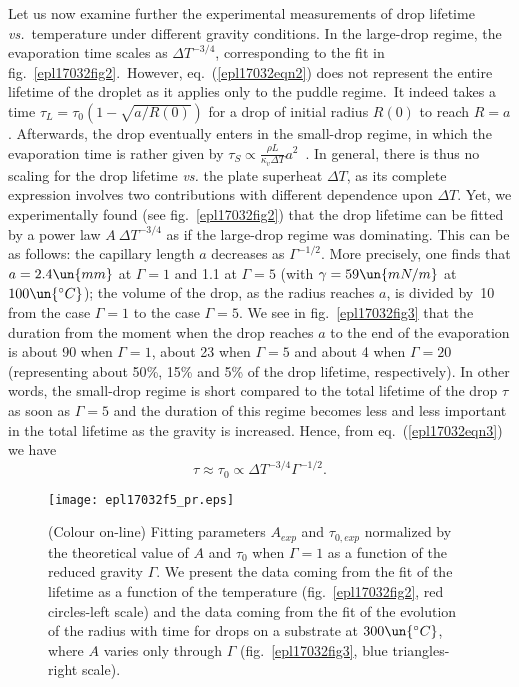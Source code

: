 \documentclass[doublecol,final]{epl2}
\begin{document}
Let us now examine further the experimental measurements of drop lifetime \textit{vs.}~temperature under different gravity conditions. In the large-drop regime, the evaporation time scales as $\Delta T^{-3/4}$, corresponding to the fit  in fig.~\ref{epl17032fig2}.~However, eq.~(\ref{epl17032eqn2}) does not represent the entire lifetime of the droplet as it applies only to the puddle regime.~It indeed takes a time ${\tau_L=\tau_0 (1-\sqrt{a/R(0)})}$ for a drop of initial radius $R(0)$ to reach $R=a$. Afterwards, the drop eventually enters in the small-drop regime, in which the evaporation time is rather given by $\tau_S \propto \frac{\rho L}{\kappa_v \Delta T} a^2$~\cite{epl17032bib3}. In general, there is thus no scaling for the drop lifetime \textit{vs.} the plate superheat $\Delta T$, as its complete expression involves two contributions with different dependence upon $\Delta T$. Yet, we experimentally found (see fig.~\ref{epl17032fig2}) that the drop lifetime can be fitted by a power law $A\ \Delta T^{-3/4}$ as if the large-drop regime was dominating. This can be  as follows: the capillary length $a$ decreases as $\Gamma^{-1/2}$. More precisely, one finds that $a=2.4\un{mm}$ at $\Gamma=1$ and 1.1 at $\Gamma=5$ (with $\gamma=59\un{mN/m}$ at $100\un{^\circ C}$); the volume of the drop, as the radius reaches $a$, is divided by~10 from the case $\Gamma=1$ to the case $\Gamma=5$. We see in fig.~\ref{epl17032fig3} that the duration from the moment when the drop reaches $a$ to the end of the evaporation is about 90 when $\Gamma = 1$, about 23 when $\Gamma = 5$ and about 4 when $\Gamma = 20$ (representing about 50{\%}, 15{\%} and 5{\%} of the drop lifetime, respectively). In other words, the small-drop regime is short compared to the total lifetime of the drop $\tau$ as soon as $\Gamma = 5$ and the duration of this regime becomes less and less important in the total lifetime as the gravity is increased. Hence, from eq.~(\ref{epl17032eqn3}) we have
\begin{equation}%
\tau\approx\tau_0\propto\Delta T^{-3/4}\Gamma^{-1/2}. \label{epl17032eqn4}
\end{equation}

\begin{figure}%
\centering
\texttt{[image: epl17032f5\_pr.eps]}
\caption{(Colour on-line) Fitting parameters $A_{\textit{exp}}$ and $\tau_{0,\textit{exp}}$ normalized by the theoretical value of $A$ and $\tau_0$ when $\Gamma=1$ as a function of the reduced gravity $\Gamma$. We present the data coming from the fit of the lifetime as a function of the temperature (fig.~\ref{epl17032fig2}, red circles-left scale) and the data coming from the fit of the evolution of the radius with time for drops on a substrate at $300\un{^\circ C}$, where $A$ varies only through $\Gamma$ (fig.~\ref{epl17032fig3}, blue triangles-right scale).} \label{epl17032fig5}
\end{figure}
\end{document}
